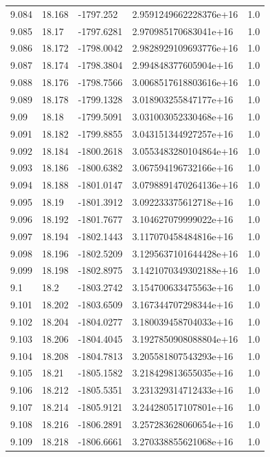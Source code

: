 \begin{tabular}{lllll}
9.084 & 18.168 & -1797.252 & 2.9591249662228376e+16 & 1.0 \\
9.085 & 18.17 & -1797.6281 & 2.970985170683041e+16 & 1.0 \\
9.086 & 18.172 & -1798.0042 & 2.9828929109693776e+16 & 1.0 \\
9.087 & 18.174 & -1798.3804 & 2.994848377605904e+16 & 1.0 \\
9.088 & 18.176 & -1798.7566 & 3.0068517618803616e+16 & 1.0 \\
9.089 & 18.178 & -1799.1328 & 3.018903255847177e+16 & 1.0 \\
9.09 & 18.18 & -1799.5091 & 3.031003052330468e+16 & 1.0 \\
9.091 & 18.182 & -1799.8855 & 3.043151344927257e+16 & 1.0 \\
9.092 & 18.184 & -1800.2618 & 3.0553483280104864e+16 & 1.0 \\
9.093 & 18.186 & -1800.6382 & 3.067594196732166e+16 & 1.0 \\
9.094 & 18.188 & -1801.0147 & 3.0798891470264136e+16 & 1.0 \\
9.095 & 18.19 & -1801.3912 & 3.092233375612718e+16 & 1.0 \\
9.096 & 18.192 & -1801.7677 & 3.104627079999022e+16 & 1.0 \\
9.097 & 18.194 & -1802.1443 & 3.117070458484816e+16 & 1.0 \\
9.098 & 18.196 & -1802.5209 & 3.1295637101644428e+16 & 1.0 \\
9.099 & 18.198 & -1802.8975 & 3.1421070349302188e+16 & 1.0 \\
9.1 & 18.2 & -1803.2742 & 3.154700633475563e+16 & 1.0 \\
9.101 & 18.202 & -1803.6509 & 3.167344707298344e+16 & 1.0 \\
9.102 & 18.204 & -1804.0277 & 3.180039458704033e+16 & 1.0 \\
9.103 & 18.206 & -1804.4045 & 3.1927850908088804e+16 & 1.0 \\
9.104 & 18.208 & -1804.7813 & 3.205581807543293e+16 & 1.0 \\
9.105 & 18.21 & -1805.1582 & 3.218429813655035e+16 & 1.0 \\
9.106 & 18.212 & -1805.5351 & 3.231329314712433e+16 & 1.0 \\
9.107 & 18.214 & -1805.9121 & 3.244280517107801e+16 & 1.0 \\
9.108 & 18.216 & -1806.2891 & 3.257283628060654e+16 & 1.0 \\
9.109 & 18.218 & -1806.6661 & 3.270338855621068e+16 & 1.0 \\

\end{tabular}
